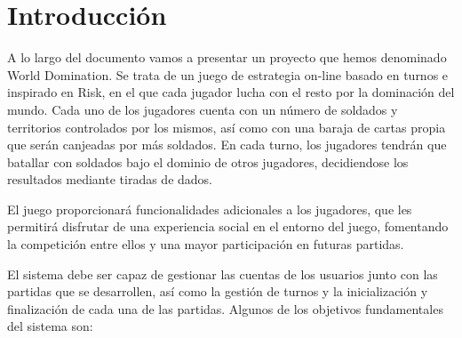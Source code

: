 \documentclass[12pt, a4paper, titlepage]{article}
\begin{document}
\thispagestyle{empty}
\fontsize{12pt}{12pt}\selectfont

\setcounter{tocdepth}{2}

\begingroup
\hypersetup{linkcolor=black}
    \tableofcontents
\endgroup

\thispagestyle{empty}

\clearpage
\setcounter{page}{1}
\section{Introducción}
A lo largo del documento vamos a presentar un proyecto que hemos denominado World Domination. Se trata de un juego de estrategia on-line basado en turnos e inspirado en Risk, en el que cada jugador lucha con el resto por la dominación del mundo. Cada uno de los jugadores cuenta con un número de soldados y territorios controlados por los mismos, así como con una baraja de cartas propia que serán canjeadas por más soldados. En cada turno, los jugadores tendrán que batallar con soldados bajo el dominio de otros jugadores, decidiendose los resultados mediante tiradas de dados.

El juego proporcionará funcionalidades adicionales a los jugadores, que les permitirá disfrutar de una experiencia social en el entorno del juego, fomentando la competición entre ellos y una mayor participación en futuras partidas.

El sistema debe ser capaz de gestionar las cuentas de los usuarios junto con las partidas que se desarrollen, así como la gestión de turnos y la inicialización y finalización de cada una de las partidas. Algunos de los objetivos fundamentales del sistema son: 
\end{document}
